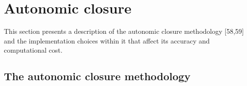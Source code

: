 \graphicspath{ {./Ch3/}  } 

\chapter{Autonomic closure}

This section presents a description of the autonomic closure methodology [58,59] and the implementation choices within it that affect its accuracy and computational cost. 
 
\section{The autonomic closure methodology} 

